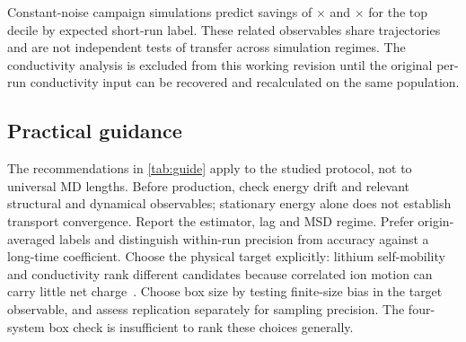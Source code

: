 \documentclass[preprint,12pt]{elsarticle}
\begin{document}
Constant-noise campaign simulations predict savings of $\times$\genTfsiSaving{} and
$\times$\genLiSaving{} for the top decile by expected short-run label. These related observables
share trajectories and are not independent tests of transfer across simulation regimes.
The conductivity analysis is excluded from this working revision until the original per-run
conductivity input can be recovered and recalculated on the same population.
\fi

\begin{table}[ht]
\centering
\caption{Results for the origin-averaged ion diffusivities at half the run length
\ifconductivityready and the platform's cluster conductivity\fi.
The population is one original label per screening system; noise comes from \nRep{} replica pairs.
Predicted: correlation implied by the measurement model. Allocation uses constant noise and
targets expected short-run labels.}\label{tab:general}
\resizebox{\textwidth}{!}{}
\end{table}

\subsection{Practical guidance}\label{sec:res-guide}
The recommendations in \cref{tab:guide} apply to the studied protocol, not to universal MD lengths.
Before production, check energy drift and relevant structural and dynamical observables;
stationary energy alone does not establish transport convergence. Report the estimator, lag and
MSD regime. Prefer origin-averaged labels and distinguish within-run precision from accuracy
against a long-time coefficient. Choose the physical target explicitly: lithium self-mobility
and conductivity rank different candidates because correlated ion motion can carry little net
charge~\cite{FranceLanord2019NernstEinstein}. Choose box size by testing finite-size bias in
the target observable, and assess replication separately for sampling precision. The four-system
box check is insufficient to rank these choices generally.
\end{document}
